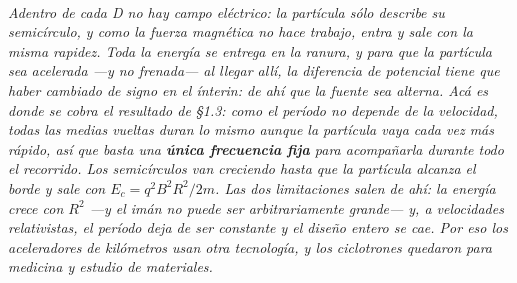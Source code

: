 \begin{center}
\\[0.5em]
{\small\itshape Adentro de cada D no hay campo eléctrico: la partícula sólo
describe su semicírculo, y como la fuerza magnética no hace trabajo, entra y
sale con la misma rapidez. Toda la energía se entrega en la ranura, y para que
la partícula sea acelerada ---y no frenada--- al llegar allí, la diferencia de
potencial tiene que haber cambiado de signo en el ínterin: de ahí que la fuente
sea alterna. Acá es donde se cobra el resultado de §1.3: como el período no
depende de la velocidad, \emph{todas} las medias vueltas duran lo mismo aunque
la partícula vaya cada vez más rápido, así que basta una \textbf{única
frecuencia fija} para acompañarla durante todo el recorrido. Los semicírculos
van creciendo hasta que la partícula alcanza el borde y sale con
$E_c = q^2B^2R^2/2m$. Las dos limitaciones salen de ahí: la energía crece con
$R^2$ ---y el imán no puede ser arbitrariamente grande--- y, a velocidades
relativistas, el período deja de ser constante y el diseño entero se cae. Por
eso los aceleradores de kilómetros usan otra tecnología, y los ciclotrones
quedaron para medicina y estudio de materiales.}
\end{center}

